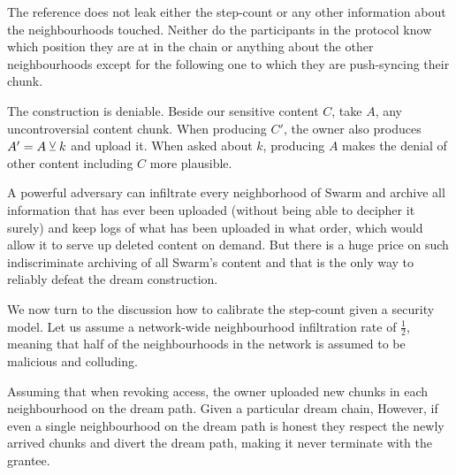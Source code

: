 The reference does not leak either the step-count or any other information about the neighbourhoods touched. Neither do the participants in the protocol know which position they are at in the chain or anything  about the other neighbourhoods except for the following one to which they are push-syncing their chunk.

The construction is deniable.
Beside our sensitive content $C$, take $A$, any uncontroversial content chunk. When producing $C'$, the owner also produces  $A'=A\veebar k$ and upload it. When asked about $k$, producing $A$ makes the denial of other content including $C$ more plausible. \qedsymbol


A powerful adversary can infiltrate every neighborhood of Swarm and archive all information that has ever been uploaded (without being able to decipher it surely) and keep logs of what has been uploaded in what order, which would allow it to serve up deleted content on demand. But there is a huge price on such indiscriminate archiving of all Swarm's content and that is the only way to reliably defeat the dream construction.

We now turn to the discussion how to calibrate the step-count given a security model. Let us assume a network-wide neighbourhood infiltration rate of $\frac{1}{2}$, meaning that  half of the neighbourhoods in the network is assumed  to be  malicious and colluding. 

Assuming that when  revoking access, the owner uploaded new chunks in each neighbourhood on the dream path. 
Given a particular dream chain, 
However, if even  a single neighbourhood on the dream path is honest they respect the newly arrived chunks and divert the dream path, making it never terminate with the grantee. 

